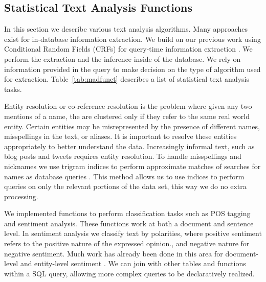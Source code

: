 \subsection{Statistical Text Analysis Functions}

In this section we describe various text analysis algorithms.
Many approaches exist for in-database information extraction. 
We build on our previous work using Conditional Random Fields (CRFs) for 
query-time information extraction \cite{wang2011hybrid}.
We perform the extraction and the inference inside of the database. 
We rely on information
provided in the query to make decision on the type of algorithm used 
for extraction. 
Table~\ref{tab:madfunct} describes a list of statistical text 
analysis tasks.

Entity resolution or co-reference resolution is the problem where given any two
mentions of a name, the are clustered only if they refer to the same real 
world entity. 
Certain entities may be misrepresented by the presence of different names, 
misspellings in the text, or aliases. It is important to
resolve these entities appropriately to better understand the data. Increasingly
informal text, such as blog posts and tweets requires entity resolution. 
To handle misspellings and nicknames we use trigram indices to perform 
approximate matches of searches for names as database queries 
\cite{Jain:2009:BQO:1519103.1519108}. 
This method allows us to use indices to perform queries on only the relevant
portions of the data set, this way we do no extra processing.

We implemented functions to perform classification tasks such as POS tagging and 
sentiment analysis. These functions work at both a document and sentence level.
In sentiment analysis we classify text by polarities, where positive
sentiment refers to the positive nature of the expressed opinion., and negative
nature for negative sentiment. Much work has already been done in this
area for document-level and entity-level sentiment \cite{o2010tweets,
zhang2011combining}. 
 We can join with other tables
and functions within a SQL query, allowing more complex queries to be 
declaratively realized. 



